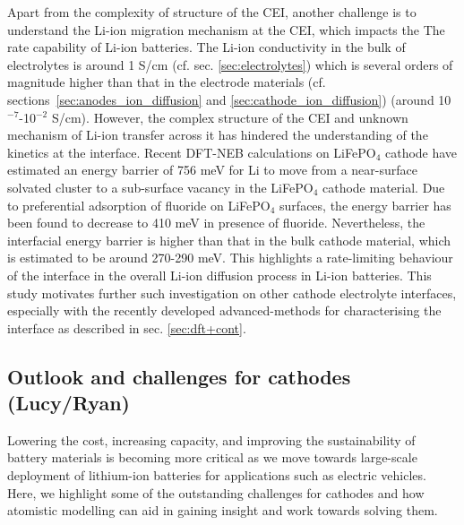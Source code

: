 \documentclass[../main.tex]{subfiles}
\begin{document}
Apart from the complexity of structure of the CEI, another challenge is to understand the Li-ion migration mechanism at the CEI, which impacts the The rate capability of Li-ion batteries. The Li-ion conductivity in the bulk of electrolytes is around 1 S/cm (cf. sec. \ref{sec:electrolytes}) which is several orders of magnitude higher than that in the electrode materials (cf. sections~\ref{sec:anodes_ion_diffusion} and \ref{sec:cathode_ion_diffusion}) (around 10$^{-7}$-10$^{-2}$ S/cm).\cite{park2010review, VanDerVen2013} However, the complex structure of the CEI and unknown mechanism of Li-ion transfer across it has hindered the understanding of the kinetics at the interface. Recent DFT-NEB calculations on LiFePO$_4$ cathode have estimated an energy barrier of 756 meV for Li to move from a near-surface solvated cluster to a sub-surface vacancy in the LiFePO$_4$ cathode material.\cite{Bhandari2019} Due to preferential adsorption of fluoride on LiFePO$_4$ surfaces,\cite{Edstrom2004, Bhandari2020} the energy barrier has been found to decrease to 410 meV in presence of fluoride. Nevertheless, the interfacial energy barrier is higher than that in the bulk cathode material, which is estimated to be around 270-290 meV.\cite{Morgan2004,Dathar2011} This highlights a rate-limiting behaviour of the interface in the overall Li-ion diffusion process in Li-ion batteries. This study motivates further such investigation on other cathode electrolyte interfaces, especially with the recently developed advanced-methods for characterising the interface as described in sec. \ref{sec:dft+cont}.  

\subsection{Outlook and challenges for cathodes (Lucy/Ryan)}
Lowering the cost, increasing capacity, and improving the sustainability of battery materials is becoming more critical as we move towards large-scale deployment of lithium-ion batteries for applications such as electric vehicles. \cite{dunn2011electrical} Here, we highlight some of the outstanding challenges for cathodes and how atomistic modelling can aid in gaining insight and work towards solving them.
\end{document}
